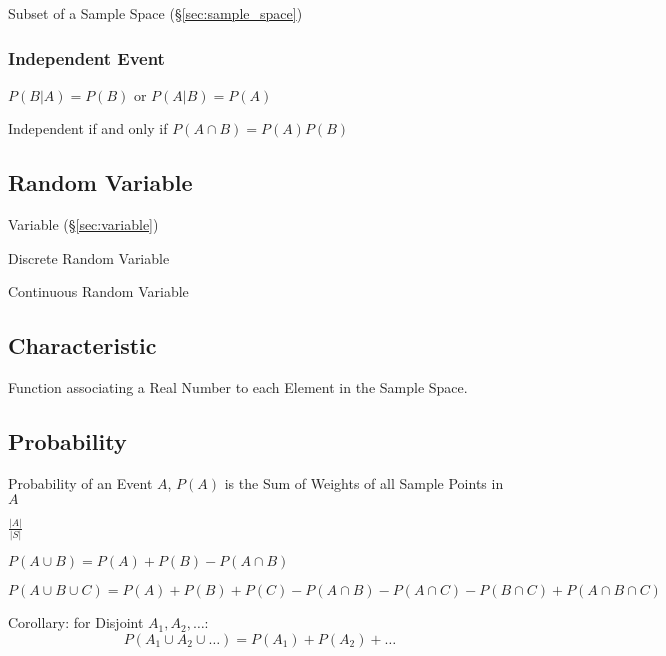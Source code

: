 Subset of a Sample Space (\S\ref{sec:sample_space})



\subsubsection{Independent Event}\label{sec:independent_event}

$P(B|A) = P(B)$ or $P(A|B) = P(A)$

Independent if and only if $P(A \cap B) = P(A) P(B)$



\subsection{Random Variable}\label{sec:random_variable}

Variable (\S\ref{sec:variable})

Discrete Random Variable

Continuous Random Variable



\subsection{Characteristic}\label{sec:characteristic}

Function associating a Real Number to each Element in the Sample
Space.



\subsection{Probability}\label{sec:probability}

Probability of an Event $A$, $P(A)$ is the Sum of Weights of all
Sample Points in $A$

$\frac{|A|}{|S|}$

$P(A \cup B) = P(A) + P(B) - P(A \cap B)$

$P(A \cup B \cup C) = P(A) + P(B) + P(C) - P(A \cap B) - P(A \cap C) -
P(B \cap C) + P(A \cap B \cap C)$

Corollary: for Disjoint $A_1, A_2, \ldots$:
\[
  P(A_1 \cup A_2 \cup \ldots) = P(A_1) + P(A_2) + \ldots
\]

